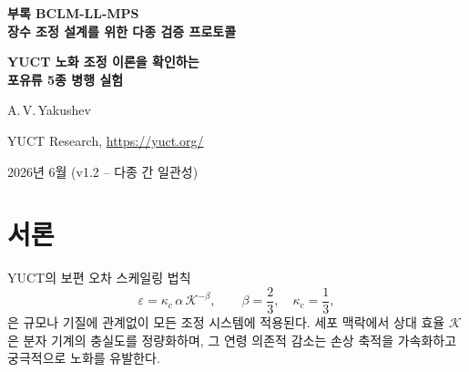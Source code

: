 \documentclass[12pt,a4paper]{article}
\newcommand{\REL}{\mathcal{K}}          %
\begin{document}
	
	\begin{titlepage}
		\centering
		\vspace*{2cm}
		{\Huge\bfseries 부록 BCLM-LL-MPS\\[0.3cm]
			장수 조정 설계를 위한 다종 검증 프로토콜\par}
		\vspace{0.5cm}
		{\Large\bfseries YUCT 노화 조정 이론을 확인하는\\포유류 5종 병행 실험\par}
		\vspace{1.5cm}
		{\large A.\,V.\,Yakushev\par}
		{\normalsize YUCT Research, \url{https://yuct.org/}\par}
		\vspace{1.0cm}
		{\normalsize 2026년 6월 (v1.2 – 다종 간 일관성)}\par
		\vfill
		\begin{abstract}
			\noindent
			YUCT 생물 조정 라그랑지안 (BCLM)은 서열 데이터만으로 임의의 단백질이나 경로에 대한 조정 효율 \(K_{\mathrm{eff}}\)을 예측할 수 있게 한다. 노화의 조정 이론의 보편성을 입증하기 위해, 우리는 널리 사용되는 5종의 실험용 포유류——생쥐 (\textit{Mus musculus}), 쥐 (\textit{Rattus norvegicus}), 돼지 (\textit{Sus scrofa}), 긴꼬리원숭이 (\textit{Macaca fascicularis}), 개 (\textit{Canis familiaris})——에 대한 병행 실험 설계를 제시한다. 각 종에 대해 직교(ortholog) 표적 유전자를 동정하고, BCLM 파이프라인을 사용하여 야생형과 최적화형의 상대 조정 효율 \(\REL\)을 계산하며, 보편 오차 법칙 \(\varepsilon = \kappa_c \alpha \REL^{-\beta}\) (\(\beta=2/3\), \(\kappa_c=1/3\))으로부터 돌연변이율, 산화 스트레스, 단백질 응집, 이동 속도, 복제 수명에 대한 정량적 예측을 직접 도출한다. 비교 표에는 인간 세포의 해당 값(자매 프로토콜 BCLM‑LL에서)도 포함된다. 실험은 상업적으로 이용 가능한 세포주, 공개 서열 데이터베이스, 표준 세포생물학 분석에만 의존한다. 제어 회귀(CCR) 모듈은 노화 표현형의 가역성을 종 간에 확인한다. 모든 예측은 사전 등록되었고 반증 가능하다. 프로토콜은 \textit{in vivo} 전달 방법을 의도적으로 생략했으며, 윤리적 측면은 부록~\(\Sigma\)에서 논의한다.
		\end{abstract}
	\end{titlepage}
	
	\tableofcontents
	\newpage
	
	\section{서론}
	\label{sec:intro}
	YUCT의 보편 오차 스케일링 법칙
	\begin{equation}
		\varepsilon = \kappa_c \, \alpha \, \REL^{-\beta}, \qquad \beta = \frac{2}{3},\quad \kappa_c = \frac{1}{3},
		\label{eq:error-law}
	\end{equation}
	은 규모나 기질에 관계없이 모든 조정 시스템에 적용된다. 세포 맥락에서 상대 효율 \(\REL\)은 분자 기계의 충실도를 정량화하며, 그 연령 의존적 감소는 손상 축적을 가속화하고 궁극적으로 노화를 유발한다.
	
\end{document}
